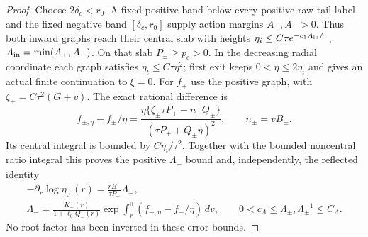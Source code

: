 \begin{proof}
Choose \(2\delta_c<r_0\). A fixed positive band below every
positive raw-tail label and the fixed negative band
\([\delta_c,r_0]\) supply action margins \(A_+,A_->0\).
Thus both inward graphs reach their central slab with heights
\(\eta_i\le C\tau e^{-c_1A_{\rm in}/\tau}\),
\(A_{\rm in}=\min(A_+,A_-)\). On that slab \(P_\pm\ge p_c>0\).
In the decreasing radial coordinate each graph satisfies
\(\eta_t\le C\tau\eta^2\); first exit keeps \(0<\eta\le2\eta_i\)
and gives an actual finite continuation to \(\xi=0\).
For \(f_+\) use the positive graph, with
\(\zeta_+=C\tau^2(G+v)\). The exact rational difference is
\[
 f_{\pm,\eta}-f_\pm/\eta
 =\frac{\eta\{\zeta_\pm\tau P_\pm-n_\pm Q_\pm\}}
             {(\tau P_\pm+Q_\pm\eta)^2},\qquad n_\pm=vB_\pm.
\]
Its central integral is bounded by \(C\eta_i/\tau^2\).
Together with the bounded noncentral ratio integral this proves the
positive \(\Lambda_+\) bound and, independently, the reflected identity
\begin{equation}\label{deg:compact-reflected-inward}
 \begin{gathered}
 -\partial_r\log\eta_0^-(r)=\frac{rB_-}{\tau P_-}\Lambda_-,\\
 \Lambda_-=
 \frac{K_-(r)}{1+\ell_0Q_-(r)}
       \exp\int_r^0(f_{-,\eta}-f_-/\eta)\,dv,\qquad
 0<c_\Lambda\le\Lambda_\pm,\Lambda_\pm^{-1}\le C_\Lambda.
 \end{gathered}
\end{equation}
No root factor has been inverted in these error bounds.


\end{proof}
